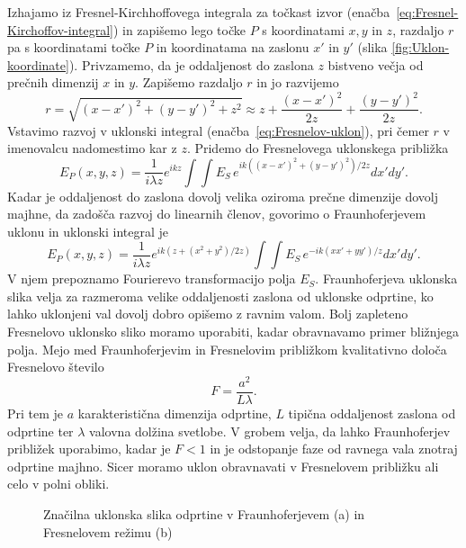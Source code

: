 Izhajamo iz Fresnel-Kirchhoffovega integrala za točkast izvor
(enačba~\ref{eq:Fresnel-Kirchoffov-integral}) in zapišemo 
lego točke $P$ s koordinatami $x,y$ in $z$, razdaljo $r$ pa 
s koordinatami točke $P$ in koordinatama na zaslonu $x'$ in $y'$ 
 (slika \ref{fig:Uklon-koordinate}). Privzamemo,
da je oddaljenost do zaslona $z$ bistveno večja od prečnih dimenzij $x$ in $y$. 
Zapišemo razdaljo $r$ in jo razvijemo
\begin{equation}
r = \sqrt{(x-x')^2+(y-y')^2 + z^2} \approx z + \frac{(x-x')^2}{2z} +\frac{(y-y')^2}{2z}.
\end{equation}
Vstavimo razvoj v uklonski integral (enačba~\ref{eq:Fresnelov-uklon}), pri 
čemer $r$ v imenovalcu nadomestimo kar z $z$. Pridemo do Fresnelovega uklonskega približka 
\begin{equation}
\label{eq:FresnelApprox}
E_P(x,y,z) =  \frac{1}{i \lambda z } e^{i k z}\int \int E_S\, e^{ik ((x-x')^2+(y-y')^2)/2z} dx' dy'.
\end{equation}
Kadar je oddaljenost do zaslona dovolj velika oziroma prečne dimenzije dovolj majhne, da zadošča 
razvoj do linearnih členov, govorimo o Fraunhoferjevem uklonu in uklonski integral je
\begin{equation}
\label{eq:FraunhoferApprox}
E_P(x,y,z) =  \frac{1}{i\lambda z} e^{i k (z + (x^2+y^2) /2z)}\int \int E_S\,
e^{-ik (xx'+yy')/z} dx' dy'.
\end{equation}
V njem  prepoznamo Fourierevo transformacijo polja $E_S$.
Fraunhoferjeva uklonska slika velja za razmeroma velike oddaljenosti
zaslona od uklonske odprtine, ko lahko uklonjeni val dovolj dobro opišemo z ravnim valom. 
Bolj zapleteno Fresnelovo uklonsko sliko moramo uporabiti, kadar obravnavamo 
primer bližnjega polja. 
Mejo med Fraunhoferjevim in Fresnelovim približkom kvalitativno določa Fresnelovo 
število
\begin{equation}
F= \frac{a^2}{L\lambda}.
\label{eq:Fst}
\end{equation} 
Pri tem je $a$ karakteristična dimenzija odprtine, $L$ tipična oddaljenost zaslona 
od odprtine ter $\lambda$ valovna dolžina svetlobe. V grobem velja, da lahko 
Fraunhoferjev približek uporabimo, kadar je $F<1$ in je odstopanje faze od ravnega vala 
znotraj odprtine majhno. Sicer moramo uklon obravnavati v Fresnelovem približku ali 
celo v polni obliki. 

\begin{figure}[h]
\centering {} 
  
\caption{Značilna uklonska slika odprtine v Fraunhoferjevem (a) in Fresnelovem režimu (b)}
\label{fig:UklonFF}
\end{figure}

